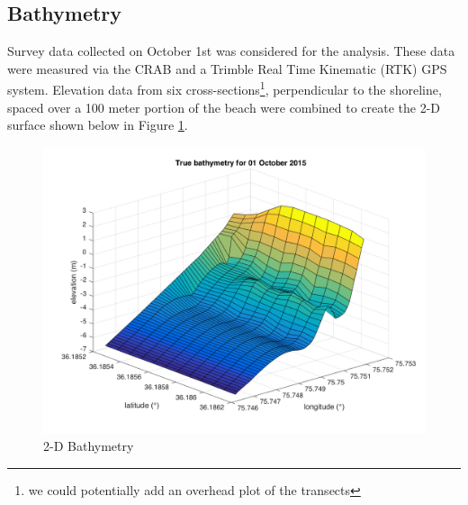 \subsection{Bathymetry}
\label{sec: bathy}

	Survey data collected on October 1st was considered for the analysis. These data were measured via the CRAB and a Trimble Real Time Kinematic (RTK) GPS system. Elevation data from six cross-sections\footnote{we could potentially add an overhead plot of the transects}, perpendicular to the shoreline, spaced over a 100 meter portion of the beach were combined to create the 2-D surface shown below in Figure \ref{2-D Bath}. 
	
	\begin{figure}[h]
	\centering
	\includegraphics[width=.6\linewidth]{img/trueBath2D.png}
	\caption{2-D Bathymetry}
	\label{2-D Bath}
	\end{figure}